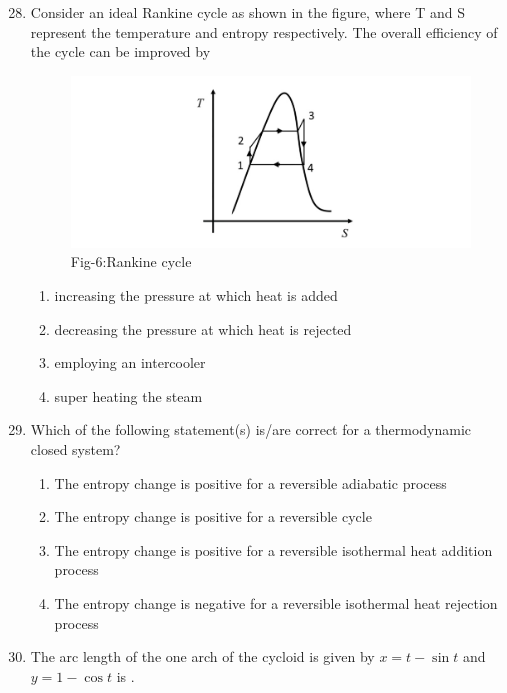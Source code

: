 \documentclass[journal]{IEEEtran}
\theoremstyle{remark}
\begin{document}
\begin{enumerate}[itemsep=1em]
\setcounter{enumi}{27}
\item Consider an ideal Rankine cycle as shown in the figure, where T and S represent the temperature and entropy respectively. The overall efficiency of the cycle can be improved by 
\begin{figure}[H]
    \centering
    \includegraphics[width=0.5\columnwidth]{figs/fig-6.jpeg}
    \caption*{Fig-6:Rankine cycle}
    \label{fig-6}
\end{figure}

\begin{enumerate}[leftmargin=2.5em, labelsep=0.5em, itemsep=0.5em]
       \item increasing the pressure at which heat is added 
       \item decreasing the pressure at which heat is rejected
       \item employing an intercooler  
       \item super heating the steam  
\end{enumerate}
\end{enumerate}

\begin{enumerate}[itemsep=1em]
\setcounter{enumi}{28}
\item Which of the following statement(s) is/are correct for a thermodynamic closed system?

\begin{enumerate}[ leftmargin=2.5em, labelsep=0.5em, itemsep=0.5em]
       \item The entropy change is positive for a reversible adiabatic process
       \item The entropy change is positive for a reversible cycle 
       \item The entropy change is positive for a reversible isothermal heat addition process  
       \item The entropy change is negative for a reversible isothermal heat rejection process   
\end{enumerate}
\end{enumerate}

\begin{enumerate}[itemsep=1em]
\setcounter{enumi}{29}
\item The arc length of the one arch of the cycloid is given by $x=t-\sin t$ and $y=1-\cos t$ is \underline{\hspace{3cm}}.

\end{enumerate}
\end{document}
